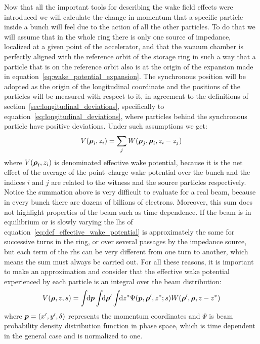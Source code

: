     Now that all the important tools for describing the wake field effects were introduced we will calculate the change in momentum that a specific particle inside a bunch will feel due to the action of all the other particles. To do that we will assume that in the whole ring there is only one source of impedance, localized at a given point of the accelerator, and that the vacuum chamber is perfectly aligned with the reference orbit of the storage ring in such a way that a particle that is on the reference orbit also is at the origin of the expansion made in equation~\eqref{eq:wake_potential_expansion}. The synchronous position will be adopted as the origin of the longitudinal coordinate and the positions of the particles will be measured with respect to it, in agreement to the definitions of section~\ref{sec:longitudinal_deviations}, specifically to equation~\eqref{eq:longitudinal_deviations}, where particles behind the synchronous particle have positive deviations. Under such assumptions we get:
    \begin{align}\label{eq:def_effective_wake_potential}
  	    V(\boldsymbol{\rho}_i, z_i) = \sum_j W(\boldsymbol{\rho}_j,\boldsymbol{\rho}_i,z_i-z_j)
    \end{align}
    where $V(\boldsymbol{\rho}_i, z_i)$ is denominated effective wake potential, because it is the net effect of the average of the point--charge wake potential over the bunch and the indices $i$ and $j$ are related to the witness and the source particles respectively. Notice the summation above is very difficult to evaluate for a real beam, because in every bunch there are dozens of billions of electrons. Moreover, this sum does not highlight properties of the beam such as time dependence. If the beam is in equilibrium or is slowly varying the \gls{lhs} of equation~\eqref{eq:def_effective_wake_potential} is approximately the same for successive turns in the ring, or over several passages by the impedance source, but each term of the \gls{rhs} can be very different from one turn to another, which means the sum must always be carried out. For all these reasons, it is important to make an approximation and consider that the effective wake potential experienced by each particle is an integral over the beam distribution:
    \begin{align}\label{eq:int_effective_wake_potential}
  	  	V(\boldsymbol{\rho}, z, s) = \int\!\!\text{d}\boldsymbol{p} \int\!\!\text{d}\boldsymbol{\rho}' \int\!\!\text{d}z^* 
	  			\Psi(\boldsymbol{p},\boldsymbol{\rho}',z^*; s) W(\boldsymbol{\rho}',\boldsymbol{\rho},z-z^*)
    \end{align}
    where $\boldsymbol{p} = (x', y', \delta)$ represents the momentum coordinates and $\Psi$ is beam probability density distribution function in phase space, which is time dependent in the general case and is normalized to one.

